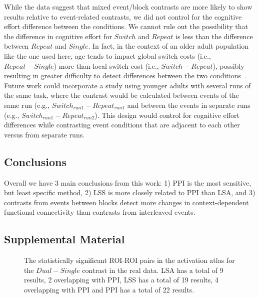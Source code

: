 \documentclass[phd,figures,tables,ackpage,abstractpage,publicabstractpage]{uithesis}
\begin{document}
While the data suggest that mixed event/block contrasts are more likely to show results relative to event-related contrasts,
we did not control for the cognitive effort difference between the conditions.
We cannot rule out the possibility that the difference in cognitive effort for
$Switch$ and $Repeat$ is less than the difference between $Repeat$ and $Single$.
In fact, in the context of an older adult population like the one used here,
age tends to impact global switch costs (i.e., $Repeat - Single$) more than local
switch cost (i.e., $Switch - Repeat$), possibly resulting in greater difficulty to detect
differences between the two conditions~\cite{Wasylyshyn2011}.
Future work could incorporate a study using younger adults with several runs of the same task, where
the contrast would be calculated between events of the same run (e.g., $Switch_{run1} - Repeat_{run1}$
and between the events in separate runs (e.g., $Switch_{run1} - Repeat_{run2}$).
This design would control for cognitive effort differences while contrasting event conditions that are adjacent
to each other versus from separate runs.

\subsection{Conclusions}
Overall we have 3 main conclusions from this work:
1) PPI is the most sensitive, but least specific method,
2) LSS is more closely related to PPI than LSA, and
3) contrasts from events between blocks detect more changes
in context-dependent functional connectivity than contrasts
from interleaved events.

\subsection{Supplemental Material}

\begin{figure}[H]
  \centering


  \caption[All contrasts for all atlases for all data for LSA/LSS versus PPI]{
      The statistically significant ROI-ROI pairs in the activation atlas
      for the $Dual - Single$ contrast in the real data.
      LSA has a total of 9 results, 2 overlapping with PPI,
      LSS has a total of 19 results, 4 overlapping with PPI and
      PPI has a total of 22 results.
  }
  \label{fig:data-real_type-brain_atlas-activation_contrast-dualxsingle}
\end{figure}
\end{document}
